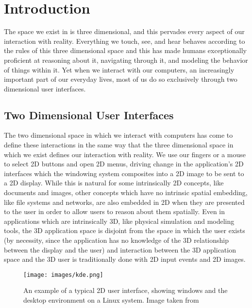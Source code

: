 \chapter{Introduction}
The space we exist in is three dimensional, and this pervades every aspect of our interaction with reality. Everything we touch, see, and hear behaves according to the rules of this three dimensional space and this has made humans exceptionally proficient at reasoning about it, navigating through it, and modeling the behavior of things within it. Yet when we interact with our computers, an increasingly important part of our everyday lives, most of us do so exclusively through two dimensional user interfaces.  
 
\section{Two Dimensional User Interfaces}

The two dimensional space in which we interact with computers has come to define these interactions in the same way that the three dimensional space in which we exist defines our interaction with reality. We use our fingers or a mouse to select 2D buttons and open 2D menus, driving change in the application's 2D interfaces which the windowing system composites into a 2D image to be sent to a 2D display. While this is natural for some intrinsically 2D concepts, like documents and images, other concepts which have no intrinsic spatial embedding, like file systems and networks, are also embedded in 2D when they are presented to the user in order to allow users to reason about them spatially. Even in applications which are intrinsically 3D, like physical simulation and modeling tools, the 3D application space is disjoint from the space in which the user exists (by necessity, since the application has no knowledge of the 3D relationship between the display and the user) and interaction between the 3D application space and the 3D user is traditionally done with 2D input events and 2D images.  

\begin{figure}[ht!]
\centering
\texttt{[image: images/kde.png]}
\caption{An example of a typical 2D user interface, showing windows and the desktop environment on a Linux system. Image taken from  \protect\cite{kde-image}}
\label{fig:kde}
\end{figure}
	
